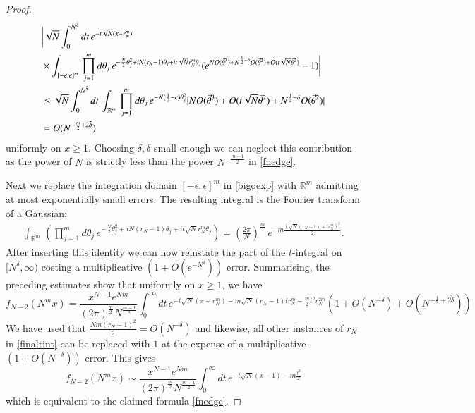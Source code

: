 \documentclass[11pt,reqno]{amsproc}
\numberwithin{equation}{section}
\numberwithin{theorem}{section}
\begin{document}
\begin{proof}
\begin{align}
&\bigg{|}\sqrt{N}\int_{0}^{N^{\tilde{\delta}}}dt\,e^{-t\sqrt{N}(x-r_{N}^{m})}\\
&\times\int_{[-\epsilon,\epsilon]^{m}}\,\prod_{j=1}^{m}d\theta_{j}\,e^{-\frac{N}{2}\theta_{j}^{2}+iN(r_{N}-1)\theta_{j}+it\sqrt{N}r_{N}^{m}\theta_{j}}(e^{NO(\vec{\theta}^{3})+N^{\frac{1}{2}-\delta}O(\vec{\theta}^{2})+O(t\sqrt{N}\vec{\theta}^{2})}-1)\bigg{|}\\
&\leq \sqrt{N}\int_{0}^{N^{\tilde{\delta}}}dt\,\int_{\mathbb{R}^{m}}\,\prod_{j=1}^{m}d\theta_{j}\,e^{-N(\frac{1}{2}-c)\theta_{j}^{2}}|NO(\vec{\theta}^{3})+O(t\sqrt{N}\vec{\theta}^{2})+N^{\frac{1}{2}-\delta}O(\vec{\theta}^{2})|\\
&= O(N^{-\frac{m}{2}+2\tilde{\delta}})
\end{align}
uniformly on $x \geq 1$. Choosing $\tilde{\delta}, \delta$ small enough we can neglect this contribution as the power of $N$ is strictly less than the power $N^{-\frac{m-1}{2}}$ in \eqref{fnedge}.

Next we replace the integration domain $[-\epsilon,\epsilon]^{m}$ in \eqref{bigoexp} with $\mathbb{R}^{m}$ admitting at most exponentially small errors. The resulting integral is the Fourier transform of a Gaussian:
\begin{align}
\int_{\mathbb{R}^{m}}\,\left(\prod_{j=1}^{m}d\theta_{j}\,e^{-\frac{N}{2}\theta_{j}^{2}+iN(r_{N}-1)\theta_{j}+it\sqrt{N}r_{N}^{m}\theta_{j}}\right) = \left(\frac{2\pi}{N}\right)^{\frac{m}{2}}\,e^{-m\frac{(\sqrt{N}(r_{N}-1)+tr_{N}^{m})^{2}}{2}}.
\end{align}
After inserting this identity we can now reinstate the part of the $t$-integral on $[N^{\delta},\infty)$ costing a multiplicative $(1+O(e^{-N^{\delta}}))$ error. Summarising, the preceding estimates show that uniformly on $x \geq 1$, we have
\begin{equation}
f_{N-2}(N^{m}x) =  \frac{x^{N-1}e^{Nm}}{(2\pi)^{\frac{m}{2}}N^{\frac{m-1}{2}}}\int_{0}^{\infty}dt\,e^{-t\sqrt{N}(x-r_{N}^{m})-m\sqrt{N}(r_{N}-1)tr_{N}^{m}-\frac{m}{2}t^{2}r_{N}^{2m}}(1+O(N^{-\delta})+O(N^{-\frac{1}{2}+2\tilde{\delta}}))\label{finaltint}
\end{equation}
We have used that $\frac{Nm(r_{N}-1)^{2}}{2} = O(N^{-\delta})$ and likewise, all other instances of $r_{N}$ in \eqref{finaltint} can be replaced with $1$ at the expense of a multiplicative $(1+O(N^{-\delta}))$ error. This gives
\begin{equation}
f_{N-2}(N^{m}x) \sim  \frac{x^{N-1}e^{Nm}}{(2\pi)^{\frac{m}{2}}N^{\frac{m-1}{2}}}\int_{0}^{\infty}dt\,e^{-t\sqrt{N}(x-1)-m\frac{t^{2}}{2}} 
\end{equation}
which is equivalent to the claimed formula \eqref{fnedge}.


\end{proof}
\end{document}
